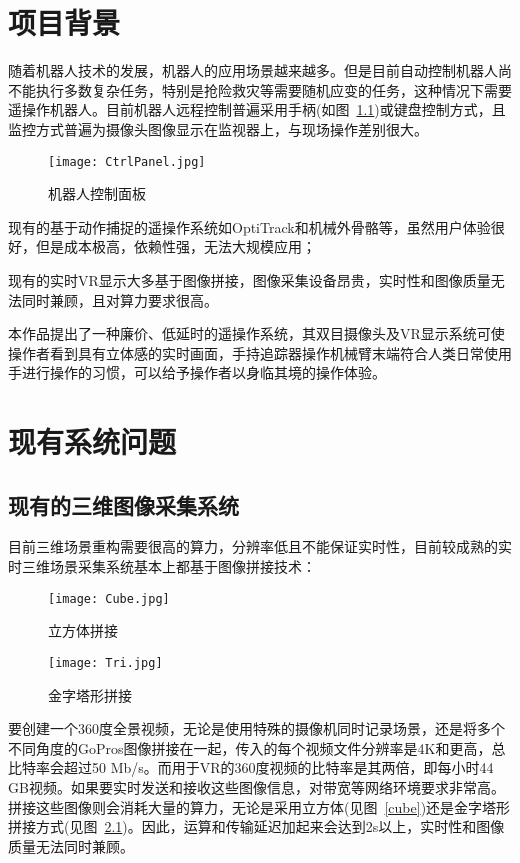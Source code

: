 \chapter{项目背景}

随着机器人技术的发展，机器人的应用场景越来越多。但是目前自动控制机器人尚不能执行多数复杂任务，特别是抢险救灾等需要随机应变的任务，这种情况下需要遥操作机器人。目前机器人远程控制普遍采用手柄(如图~\ref{panal})或键盘控制方式，且监控方式普遍为摄像头图像显示在监视器上，与现场操作差别很大。


\begin{figure}[htbp]
\centering
\texttt{[image: CtrlPanel.jpg]}
\caption{机器人控制面板} 
\label{panal}
\end{figure}

现有的基于动作捕捉的遥操作系统如OptiTrack和机械外骨骼等，虽然用户体验很好，但是成本极高，依赖性强，无法大规模应用；

现有的实时VR显示大多基于图像拼接，图像采集设备昂贵，实时性和图像质量无法同时兼顾，且对算力要求很高。

本作品提出了一种廉价、低延时的遥操作系统，其双目摄像头及VR显示系统可使操作者看到具有立体感的实时画面，手持追踪器操作机械臂末端符合人类日常使用手进行操作的习惯，可以给予操作者以身临其境的操作体验。


\chapter{现有系统问题}

\section{现有的三维图像采集系统}

目前三维场景重构需要很高的算力，分辨率低且不能保证实时性，目前较成熟的实时三维场景采集系统基本上都基于图像拼接技术：

\begin{figure}
\begin{minipage}{0.48\textwidth}
  \centering
  \texttt{[image: Cube.jpg]}
  \caption{立方体拼接}
  \label{cube}
\end{minipage}\hfill
\begin{minipage}{0.48\textwidth}
  \centering
  \texttt{[image: Tri.jpg]}
  \caption{金字塔形拼接}
  \label{tri}
\end{minipage}
\end{figure}

要创建一个360度全景视频，无论是使用特殊的摄像机同时记录场景，还是将多个不同角度的GoPros图像拼接在一起，传入的每个视频文件分辨率是4K和更高，总比特率会超过50 Mb/s。而用于VR的360度视频的比特率是其两倍，即每小时44 GB视频。如果要实时发送和接收这些图像信息，对带宽等网络环境要求非常高。拼接这些图像则会消耗大量的算力，无论是采用立方体(见图~\ref{cube})还是金字塔形拼接方式(见图~\ref{tri})。因此，运算和传输延迟加起来会达到2s以上，实时性和图像质量无法同时兼顾。

